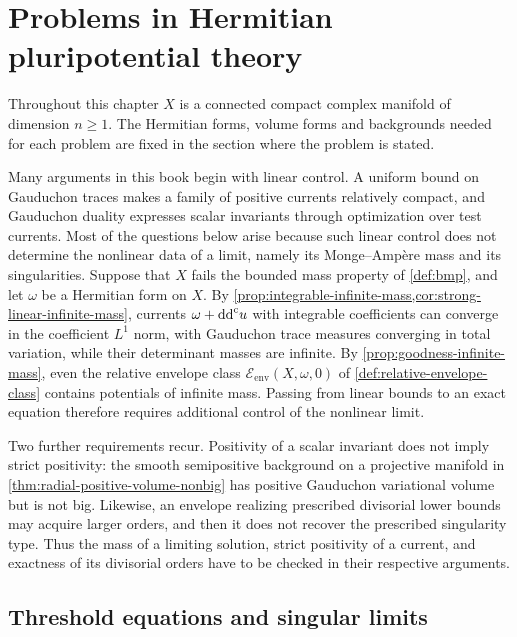 \chapter{Problems in Hermitian pluripotential theory}
\label{chap:research-program}

\begingroup
{}

Throughout this chapter $X$ is a connected compact complex manifold of dimension $n\geq1$. The Hermitian forms, volume forms and backgrounds needed for each problem are fixed in the section where the problem is stated.

Many arguments in this book begin with linear control. A uniform bound on Gauduchon traces makes a family of positive currents relatively compact, and Gauduchon duality expresses scalar invariants through optimization over test currents. Most of the questions below arise because such linear control does not determine the nonlinear data of a limit, namely its Monge--Amp\`ere mass and its singularities. Suppose that $X$ fails the bounded mass property of \cref{def:bmp}, and let $\omega$ be a Hermitian form on $X$. By \cref{prop:integrable-infinite-mass,cor:strong-linear-infinite-mass}, currents $\omega+\mathrm{dd}^{\mathrm{c}} u$ with integrable coefficients can converge in the coefficient $L^1$ norm, with Gauduchon trace measures converging in total variation, while their determinant masses are infinite. By \cref{prop:goodness-infinite-mass}, even the relative envelope class $\mathcal E_{\mathrm{env}}(X,\omega,0)$ of \cref{def:relative-envelope-class} contains potentials of infinite mass. Passing from linear bounds to an exact equation therefore requires additional control of the nonlinear limit.

Two further requirements recur. Positivity of a scalar invariant does not imply strict positivity: the smooth semipositive background on a projective manifold in \cref{thm:radial-positive-volume-nonbig} has positive Gauduchon variational volume but is not big. Likewise, an envelope realizing prescribed divisorial lower bounds may acquire larger orders, and then it does not recover the prescribed singularity type. Thus the mass of a limiting solution, strict positivity of a current, and exactness of its divisorial orders have to be checked in their respective arguments.

\section{Threshold equations and singular limits}

